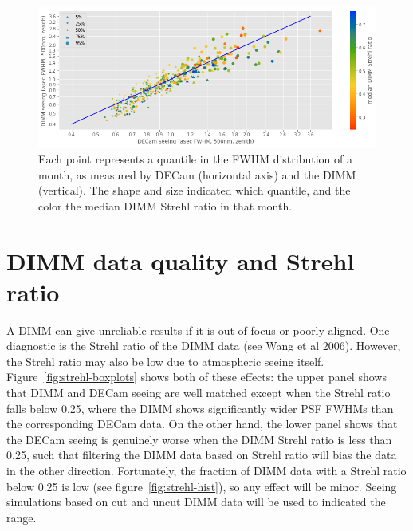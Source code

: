 \documentclass[DM,authoryear,toc]{lsstdoc}
\begin{document}
\begin{figure}
  \includegraphics[width=\columnwidth]{./figures/dimm_vs_decam.png}
  \caption{
    Each point represents a quantile in the FWHM distribution of a
    month, as measured by DECam (horizontal axis) and the DIMM
    (vertical). The shape and size indicated which quantile, and the
    color the median DIMM Strehl ratio in that month.
    }
  \label{fig:dimm-vs-decam}
\end{figure}

\section{DIMM data quality and Strehl ratio}

A DIMM can give unreliable results if it is out of focus or poorly
aligned. One diagnostic is the Strehl ratio of the DIMM data (see Wang
et al 2006). However, the Strehl ratio may also be low due to
atmospheric seeing itself. Figure~\ref{fig:strehl-boxplots} shows both
of these effects: the upper panel shows that DIMM and DECam seeing are
well matched except when the Strehl ratio falls below 0.25, where the
DIMM shows significantly wider PSF FWHMs than the corresponding DECam
data. On the other hand, the lower panel shows that the DECam seeing
is genuinely worse when the DIMM Strehl ratio is less than 0.25, such
that filtering the DIMM data based on Strehl ratio will bias the data
in the other direction. Fortunately, the fraction of DIMM data with a
Strehl ratio below 0.25 is low (see figure~\ref{fig:strehl-hist}), so
any effect will be minor. Seeing simulations based on cut and
uncut DIMM data will be used to indicated the range.
\end{document}
